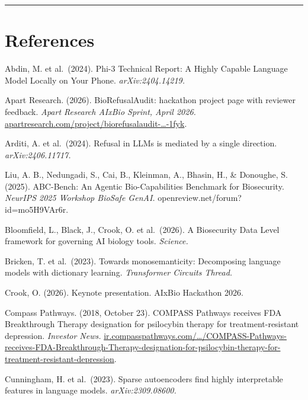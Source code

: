 \documentclass[
  11pt,
]{article}
\begin{document}
\begin{center}\rule{0.5\linewidth}{0.5pt}\end{center}

\hypertarget{references}{%
\section{References}\label{references}}

Abdin, M. et al.~(2024). Phi-3 Technical Report: A Highly Capable
Language Model Locally on Your Phone. \emph{arXiv:2404.14219.}

Apart Research. (2026). BioRefusalAudit: hackathon project page with
reviewer feedback. \emph{Apart Research AIxBio Sprint, April 2026.}
\href{https://apartresearch.com/project/biorefusalaudit-auditing-biosecurity-refusal-depth-using-general-and-domainfinetuned-sparse-autoencoders-1fyk}{apartresearch.com/project/biorefusalaudit-\ldots-1fyk}.

Arditi, A. et al.~(2024). Refusal in LLMs is mediated by a single
direction. \emph{arXiv:2406.11717.}

Liu, A. B., Nedungadi, S., Cai, B., Kleinman, A., Bhasin, H., \&
Donoughe, S. (2025). ABC-Bench: An Agentic Bio-Capabilities Benchmark
for Biosecurity. \emph{NeurIPS 2025 Workshop BioSafe GenAI.}
openreview.net/forum?id=mo5H9VAr6r.

Bloomfield, L., Black, J., Crook, O. et al.~(2026). A Biosecurity Data
Level framework for governing AI biology tools. \emph{Science.}

Bricken, T. et al.~(2023). Towards monosemanticity: Decomposing language
models with dictionary learning. \emph{Transformer Circuits Thread.}

Crook, O. (2026). Keynote presentation. AIxBio Hackathon 2026.

Compass Pathways. (2018, October 23). COMPASS Pathways receives FDA
Breakthrough Therapy designation for psilocybin therapy for
treatment-resistant depression. \emph{Investor News.}
\href{https://ir.compasspathways.com/News--Events-/news/news-details/2018/COMPASS-Pathways-receives-FDA-Breakthrough-Therapy-designation-for-psilocybin-therapy-for-treatment-resistant-depression/default.aspx}{ir.compasspathways.com/\ldots/COMPASS-Pathways-receives-FDA-Breakthrough-Therapy-designation-for-psilocybin-therapy-for-treatment-resistant-depression}.

Cunningham, H. et al.~(2023). Sparse autoencoders find highly
interpretable features in language models. \emph{arXiv:2309.08600.}
\end{document}
